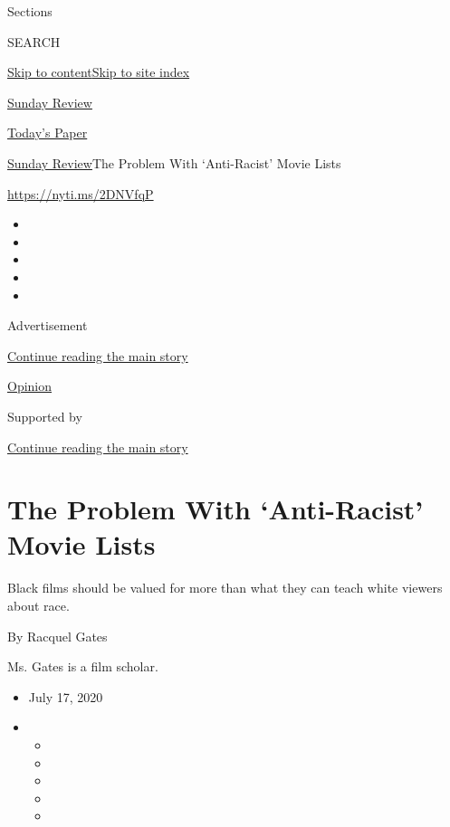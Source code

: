 Sections

SEARCH

\protect\hyperlink{site-content}{Skip to
content}\protect\hyperlink{site-index}{Skip to site index}

\href{https://www.nytimes.com/section/opinion/sunday}{Sunday Review}

\href{https://myaccount.nytimes.com/auth/login?response_type=cookie\&client_id=vi}{}

\href{https://www.nytimes.com/section/todayspaper}{Today's Paper}

\href{/section/opinion/sunday}{Sunday Review}\textbar{}The Problem With
`Anti-Racist' Movie Lists

\href{https://nyti.ms/2DNVfqP}{https://nyti.ms/2DNVfqP}

\begin{itemize}
\item
\item
\item
\item
\item
\end{itemize}

Advertisement

\protect\hyperlink{after-top}{Continue reading the main story}

\href{/section/opinion}{Opinion}

Supported by

\protect\hyperlink{after-sponsor}{Continue reading the main story}

\hypertarget{the-problem-with-anti-racist-movie-lists}{%
\section{The Problem With `Anti-Racist' Movie
Lists}\label{the-problem-with-anti-racist-movie-lists}}

Black films should be valued for more than what they can teach white
viewers about race.

By Racquel Gates

Ms. Gates is a film scholar.

\begin{itemize}
\item
  July 17, 2020
\item
  \begin{itemize}
  \item
  \item
  \item
  \item
  \item
  \end{itemize}
\end{itemize}

